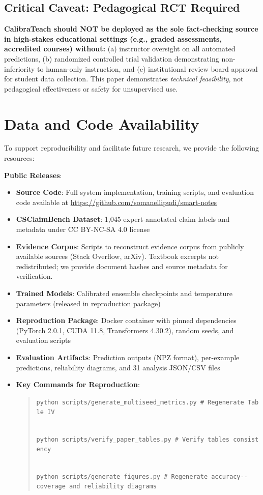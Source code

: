 \subsection{Critical Caveat: Pedagogical RCT Required}\label{critical-caveat-pedagogical-rct-required}

\textbf{CalibraTeach should NOT be deployed as the sole fact-checking source in high-stakes educational settings (e.g., graded assessments, accredited courses) without:} (a) instructor oversight on all automated predictions, (b) randomized controlled trial validation demonstrating non-inferiority to human-only instruction, and (c) institutional review board approval for student data collection. This paper demonstrates \emph{technical feasibility}, not pedagogical effectiveness or safety for unsupervised use.

\section{Data and Code Availability}\label{data-and-code-availability}

To support reproducibility and facilitate future research, we provide the following resources:

\textbf{Public Releases}:

\begin{itemize}
\item
  \textbf{Source Code}: Full system implementation, training scripts, and evaluation code available at \url{https://github.com/somanellipudi/smart-notes}
\item
  \textbf{CSClaimBench Dataset}: 1,045 expert-annotated claim labels and metadata under CC BY-NC-SA 4.0 license
\item
  \textbf{Evidence Corpus}: Scripts to reconstruct evidence corpus from publicly available sources (Stack Overflow, arXiv). Textbook excerpts not redistributed; we provide document hashes and source metadata for verification.
\item
  \textbf{Trained Models}: Calibrated ensemble checkpoints and temperature parameters (released in reproduction package)
\item
  \textbf{Reproduction Package}: Docker container with pinned dependencies (PyTorch 2.0.1, CUDA 11.8, Transformers 4.30.2), random seeds, and evaluation scripts
\item
  \textbf{Evaluation Artifacts}: Prediction outputs (NPZ format), per-example predictions, reliability diagrams, and 31 analysis JSON/CSV files
\item
  \textbf{Key Commands for Reproduction}:

  \begin{quote}
  \texttt{python\ scripts/generate\_multiseed\_metrics.py\ \#\ Regenerate\ Table\ IV}\strut \\
  \texttt{python\ scripts/verify\_paper\_tables.py\ \#\ Verify\ tables\ consistency}\strut \\
  \texttt{python\ scripts/generate\_figures.py\ \#\ Regenerate\ accuracy-\/-coverage\ and\ reliability\ diagrams}
  \end{quote}
\end{itemize}


